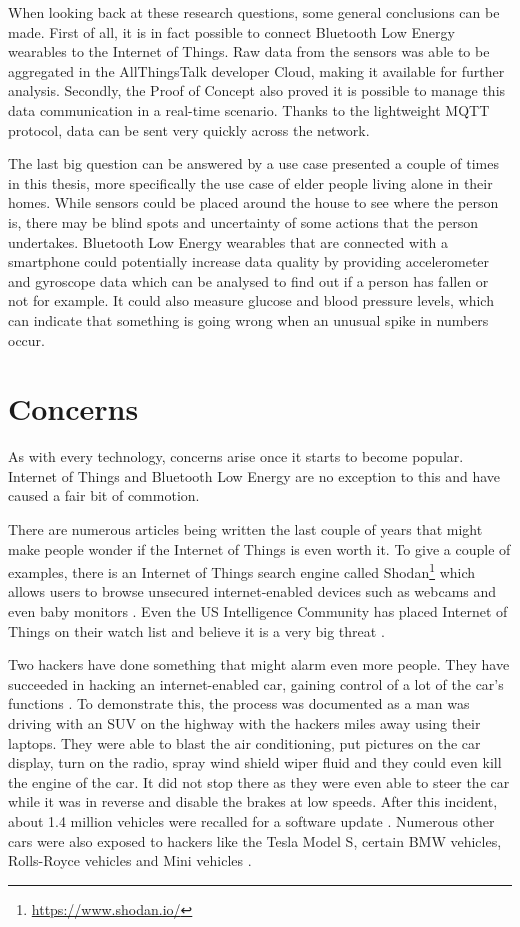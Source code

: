 \documentclass[pdftex,a4paper,12pt,twoside]{report}
\begin{document}
When looking back at these research questions, some general conclusions can be made. First of all, it is in fact possible to connect Bluetooth Low Energy wearables to the Internet of Things. Raw data from the sensors was able to be aggregated in the AllThingsTalk developer Cloud, making it available for further analysis. Secondly, the Proof of Concept also proved it is possible to manage this data communication in a real-time scenario. Thanks to the lightweight MQTT protocol, data can be sent very quickly across the network.

The last big question can be answered by a use case presented a couple of times in this thesis, more specifically the use case of elder people living alone in their homes. While sensors could be placed around the house to see where the person is, there may be blind spots and uncertainty of some actions that the person undertakes. Bluetooth Low Energy wearables that are connected with a smartphone could potentially increase data quality by providing accelerometer and gyroscope data which can be analysed to find out if a person has fallen or not for example. It could also measure glucose and blood pressure levels, which can indicate that something is going wrong when an unusual spike in numbers occur.

\section{Concerns}
\label{sec:concerns}

As with every technology, concerns arise once it starts to become popular. Internet of Things and Bluetooth Low Energy are no exception to this and have caused a fair bit of commotion.

There are numerous articles being written the last couple of years that might make people wonder if the Internet of Things is even worth it. To give a couple of examples, there is an Internet of Things search engine called Shodan\footnote{\url{https://www.shodan.io/}} which allows users to browse unsecured internet-enabled devices such as webcams and even baby monitors \citep{porup20162, stanislav2015}. Even the US Intelligence Community has placed Internet of Things on their watch list and believe it is a very big threat \citep{clapper2016}.

Two hackers have done something that might alarm even more people. They have succeeded in hacking an internet-enabled car, gaining control of a lot of the car's functions \citep{greenberg2015}. To demonstrate this, the process was documented as a man was driving with an SUV on the highway with the hackers miles away using their laptops. They were able to blast the air conditioning, put pictures on the car display, turn on the radio, spray wind shield wiper fluid and they could even kill the engine of the car. It did not stop there as they were even able to steer the car while it was in reverse and disable the brakes at low speeds. After this incident, about 1.4 million vehicles were recalled for a software update \citep{kessler2015}. Numerous other cars were also exposed to hackers like the Tesla Model S, certain BMW vehicles, Rolls-Royce vehicles and Mini vehicles \citep{hirsch2015}.
\end{document}
